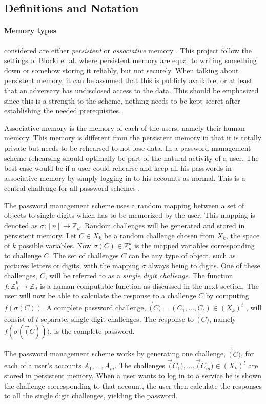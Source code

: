 \subsection{Definitions and Notation}
\paragraph{Memory types} considered are either \emph{persistent} or \emph{associative} memory \cite{human-memory}. This project follow the settings of Blocki et al. \cite{naturally-rehearsing, hcp-blocki} where persistent memory are equal to writing something down or somehow storing it reliably, but not securely. When talking about persistent memory, it can be assumed that this is publicly available, or at least that an adversary has undisclosed access to the data. This should be emphasized since this is a strength to the scheme, nothing needs to be kept secret after establishing the needed prerequisites. 
    \par Associative memory is the memory of each of the users, namely their human memory. This memory is different from the persistent memory in that it is totally private but needs to be rehearsed to not lose data. In a password management scheme rehearsing should optimally be part of the natural activity of a user. The best case would be if a user could rehearse and keep all his passwords in associative memory by simply logging in to his accounts as normal. This is a central challenge for all password schemes \cite{naturally-rehearsing}.

The password management scheme uses a random mapping between a set of objects to single digits which has to be memorized by the user. This mapping is denoted as $\sigma : [n] \rightarrow \mathbb{Z}_d$. Random challenges will be generated and stored in persistent memory. Let $C \in X_k$ be a random challenge chosen from $X_k$, the space of $k$ possible variables. Now $\sigma (C) \in \mathbb{Z}_d^k$ is the mapped variables corresponding to challenge $C$. The set of challenges $C$ can be any type of object, such as pictures letters or digits, with the mapping $\sigma$ always being to digits. One of these challenges, $C$, will be referred to as a \emph{single digit challenge}. The function $f: \mathbb{Z}^k_d \rightarrow \mathbb{Z}_d$ is a human computable function as discussed in the next section. The user will now be able to calculate the response to a challenge $C$ by computing $f(\sigma(C))$. A complete password challenge, $\vec(C) = (C_1,\dots,C_t) \in (X_k)^t$ , will consist of $t$ separate, single digit challenges. The response to $\vec(C)$, namely $f(\sigma(\vec(C)))$, is the complete password. 
\par The password management scheme works by generating one challenge, $\vec(C)$, for each of a user's accounts $A_1,\dots,A_m$. The challenges $\vec(C_1),\dots,\vec(C_m) \in (X_k)^t$ are stored in persistent memory. When a user wants to log in to a service he is shown the challenge corresponding to that account, the user then calculate the responses to all the single digit challenges, yielding the password.

